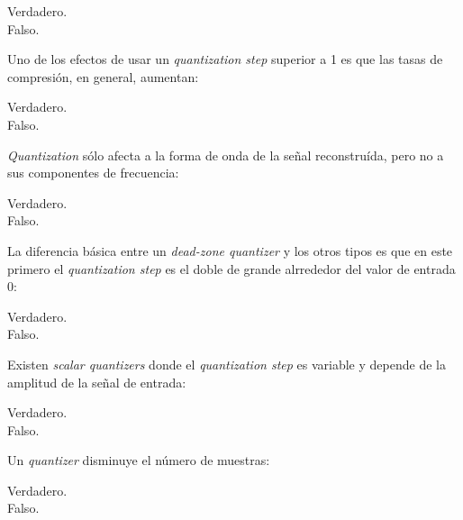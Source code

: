 \documentclass[legalpaper, 12pt, addpoints]{exam}
\begin{document}
\begin{questions}
\begin{oneparchoices}
  \choice Verdadero.\\
  \choice Falso.
\end{oneparchoices}
  
\vspace{0.10in}

\question Uno de los efectos de usar un \emph{quantization step}
superior a 1 es que las tasas de compresión, en general, aumentan:

\begin{oneparchoices}
  \choice Verdadero.\\
  \choice Falso.
\end{oneparchoices}
  
\vspace{0.10in}

\question \emph{Quantization} sólo afecta a la forma de onda de la
señal reconstruída, pero no a sus componentes de frecuencia:

\begin{oneparchoices}
  \choice Verdadero.\\
  \choice Falso.
\end{oneparchoices}
  
\vspace{0.10in}

\question La diferencia básica entre un \emph{dead-zone quantizer} y
los otros tipos es que en este primero el \emph{quantization step} es
el doble de grande alrrededor del valor de entrada 0:

\begin{oneparchoices}
  \choice Verdadero.\\
  \choice Falso.
\end{oneparchoices}
  
\vspace{0.10in}

\question Existen \emph{scalar quantizers} donde el \emph{quantization
  step} es variable y depende de la amplitud de la señal de entrada:

\begin{oneparchoices}
  \choice Verdadero.\\
  \choice Falso.
\end{oneparchoices}
  
\vspace{0.10in}

\question Un \emph{quantizer} disminuye el número de muestras:

\begin{oneparchoices}
  \choice Verdadero.\\
  \choice Falso.
\end{oneparchoices}
  

\end{questions}
\end{document}
